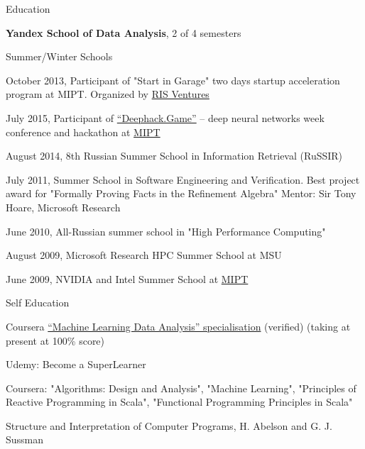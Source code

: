 \documentclass{resume} %
\begin{document}
\begin{rSection}{Education}

\textbf{Yandex School of Data Analysis}, 2 of 4 semesters


\begin{rSubsectionSchools}{Summer/Winter Schools}
\item October 2013, Participant of "Start in Garage" two days startup acceleration program at MIPT. Organized by \href{http://www.risventures.com/}{RIS Ventures}
\item July 2015, Participant of \href{http://game.deephack.me/}{``Deephack.Game''} -- deep neural
networks week conference and hackathon at \href{http://mipt.ru/}{MIPT}
\item August 2014, 8th Russian Summer School in Information Retrieval (RuSSIR)
\item July 2011, Summer School in Software Engineering and Verification. Best project award for "Formally Proving Facts in the Refinement Algebra" Mentor: Sir Tony Hoare, Microsoft Research
\item June 2010, All-Russian summer school in "High Performance Computing"
\item August 2009, Microsoft Research HPC Summer School at MSU
\item June 2009, NVIDIA and Intel Summer School at \href{http://mipt.ru/}{MIPT}
\end{rSubsectionSchools}


\begin{rSubsectionSchools}{Self Education}
\item Coursera
\href{https://www.coursera.org/specializations/machine-learning-data-analysis}{``Machine Learning
Data Analysis'' specialisation} (verified) (taking at present at 100\% score)
\item Udemy: Become a SuperLearner
\item Coursera: "Algorithms: Design and Analysis", "Machine Learning", "Principles of Reactive Programming in Scala", "Functional Programming Principles in Scala"
\item Structure and Interpretation of Computer Programs, H. Abelson and G. J. Sussman 
\end{rSubsectionSchools}

\end{rSection}

\end{document}

